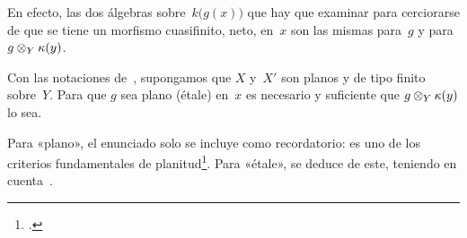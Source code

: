 En efecto, las dos álgebras sobre~$k\bigl(g(x)\bigr)$ que hay que examinar para cerciorarse de que se tiene un morfismo cuasifinito, \resp neto, en~$x$ son las mismas para~$g$ y para $g\otimes_Y\kappa(y)$.

\begin{corollaire}
\label{I.5.9}
Con
las notaciones de~, supongamos que $X$ y~$X'$ son planos y de tipo finito sobre~$Y$. Para que $g$ sea plano (\resp étale) en~$x$ es necesario y suficiente que $g\otimes_Y\kappa(y)$ lo sea.
\end{corollaire}

Para «plano», el enunciado solo se incluye como recordatorio: es uno de los criterios fundamentales de planitud\footnote{\Cf {}.}. Para «étale», se deduce de este, teniendo en cuenta~.
